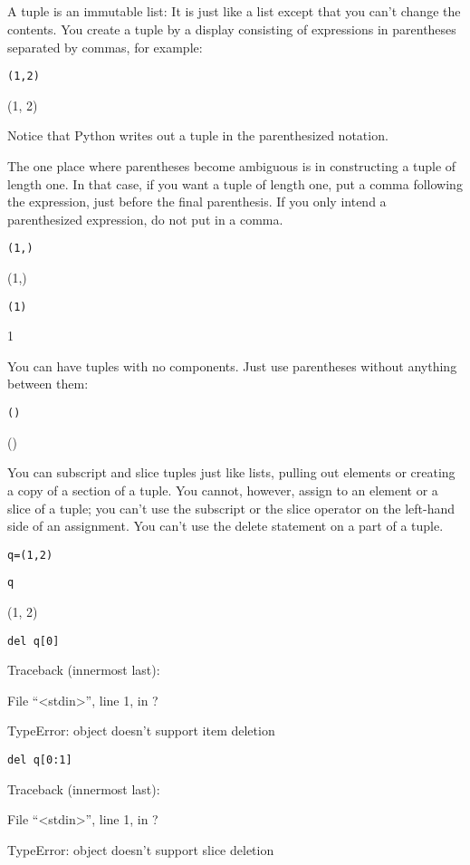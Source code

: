 \subsection[Tuples]{}


A tuple is an immutable list: It is
just like a list except that you can't change the contents. You create a
tuple by a display consisting of expressions in parentheses separated by
commas, for example:


\texttt{(1,2)}

(1, 2)

Notice that Python writes out a
tuple in the parenthesized notation.

The one place where parentheses
become ambiguous is in constructing a tuple of length one. In that case,
if you want a tuple of length one, put a comma following the expression,
just before the final parenthesis. If you only intend a parenthesized
expression, do not put in a comma.


\texttt{(1,)}

(1,)


\texttt{(1)}

1

You can have tuples with no
components. Just use parentheses without anything between them:


\texttt{()}

()

You can subscript and slice tuples
just like lists, pulling out elements or creating a copy of a section of
a tuple. You cannot, however, assign to an element or a slice of a
tuple; you can't use the subscript or the slice operator on the
left-hand side of an assignment. You can't use the delete statement on a
part of a tuple.


\texttt{q=(1,2)}


\texttt{q}

(1, 2)


\texttt{del q{[}0{]}}

Traceback (innermost last):

 File
``\textless{}stdin\textgreater{}'', line 1, in ?

TypeError: object doesn't support
item deletion


\texttt{del q{[}0:1{]}}

Traceback (innermost last):

 File
``\textless{}stdin\textgreater{}'', line 1, in ?

TypeError: object doesn't support
slice deletion


